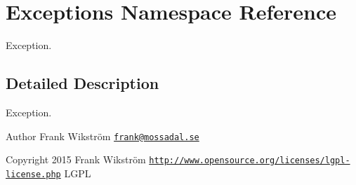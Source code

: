 \hypertarget{namespaceExceptions}{\section{Exceptions Namespace Reference}
\label{namespaceExceptions}
}


Exception.  




\subsection{Detailed Description}
Exception. \begin{DoxyAuthor}{Author}
Frank Wikström \href{mailto:frank@mossadal.se}{\tt frank@mossadal.\-se} 
\end{DoxyAuthor}
\begin{DoxyCopyright}{Copyright}
2015 Frank Wikström  \href{http://www.opensource.org/licenses/lgpl-license.php}{\tt http\-://www.\-opensource.\-org/licenses/lgpl-\/license.\-php} L\-G\-P\-L 
\end{DoxyCopyright}
